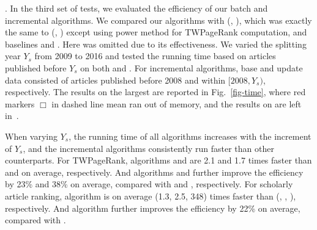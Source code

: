 


.
In the third set of tests, we evaluated the efficiency of our batch and incremental algorithms.
We compared our algorithms with \powensemble (\powtwprdag, \powtwprscc), which was exactly the same to \batensemble (\twprdag, \twprscc) except using power method for TWPageRank computation, and baselines \futurerank and \hhgrank. Here \pagerank was omitted due to its effectiveness.
We varied the splitting year $Y_s$ from 2009 to 2016 and tested the running time based on articles published before $Y_s$ on both \magdata and \aminer. %
For incremental algorithms, base and update data consisted of articles published before 2008 and within $[2008, Y_s)$, respectively.
The results on the largest \magdata are reported in Fig.~\ref{fig-time}, where red markers $\Box$ in dashed line mean \hhgrank ran out of memory, and the results on \aminer are left in~\cite{ERank-full}.

When varying $Y_s$, the running time of all algorithms increases with the increment of $Y_s$, and the incremental algorithms
consistently run faster than other counterparts.
For TWPageRank, algorithms \twprdag and \twprscc
are 2.1 and 1.7 times faster than \powtwprdag and \powtwprscc on average, respectively. And algorithms \inctwprdag and \inctwprscc further improve the efficiency  by 23\% and 38\% on average, compared with \twprdag and \twprscc, respectively.
%
For scholarly article ranking, algorithm \batensemble is on average (1.3, 2.5, 348) times faster than (\powensemble, \futurerank, \hhgrank), respectively.
And algorithm \incensemble further improves the efficiency by 22\% on average, compared with \batensemble.


